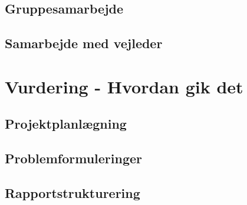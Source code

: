 \documentclass[a4paper,12pt,oneside]{article}
\begin{document}
\subsection{Gruppesamarbejde}

\subsection{Samarbejde med vejleder}


\section{Vurdering - Hvordan gik det}

\subsection{Projektplanlægning}

\subsection{Problemformuleringer}

\subsection{Rapportstrukturering}
\end{document}
